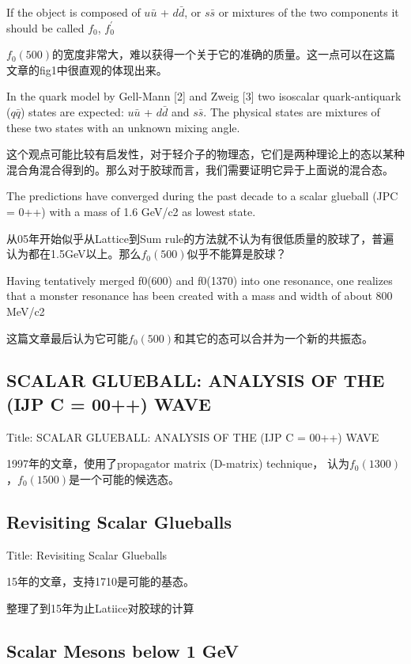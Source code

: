 \documentclass{article}
\begin{document}
If the object is composed of $u \bar{u}$ + $d \bar{d}$, or $s \bar{s}$ or mixtures of the two components it
should be called $f_0$, $f_0^\prime$

$f_0(500)$的宽度非常大，难以获得一个关于它的准确的质量。这一点可以在这篇文章的fig1中很直观的体现出来。


In the quark model by Gell-Mann [2] and Zweig [3] two isoscalar quark-antiquark
($q \bar{q}$) states are expected:  $u \bar{u}$ + $d \bar{d}$ and $s \bar{s}$. The physical states are mixtures of these two states with an unknown mixing angle.

这个观点可能比较有启发性，对于轻介子的物理态，它们是两种理论上的态以某种混合角混合得到的。那么对于胶球而言，我们需要证明它异于上面说的混合态。

The predictions have converged during the past decade to a scalar glueball (JPC = 0++) with a mass of 1.6 GeV/c2 as lowest state.

从05年开始似乎从Lattice到Sum rule的方法就不认为有很低质量的胶球了，普遍认为都在1.5GeV以上。那么$f_0(500)$似乎不能算是胶球？

Having tentatively merged f0(600) and f0(1370) into one resonance, one realizes that a monster resonance has been created with a mass and width of about 800 MeV/c2

这篇文章最后认为它可能$f_0(500)$和其它的态可以合并为一个新的共振态。


\subsection{SCALAR GLUEBALL: ANALYSIS OF THE (IJP C = 00++) WAVE}

Title: \quad SCALAR GLUEBALL: ANALYSIS OF THE (IJP C = 00++) WAVE \cite{anisovich1997scalar}

1997年的文章，使用了propagator matrix (D-matrix) technique， 认为$f_0(1300)$，$f_0(1500)$是一个可能的候选态。


\subsection{Revisiting Scalar Glueballs}

Title: Revisiting Scalar Glueballs \cite{cheng2015revisiting}

15年的文章，支持1710是可能的基态。

整理了到15年为止Latiice对胶球的计算


\subsection{ Scalar Mesons below 1 GeV}
\end{document}

